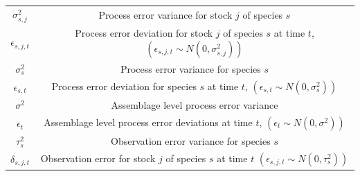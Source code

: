 \documentclass[]{scrartcl}
\begin{document}
\begin{table}[htbp]
\begin{center}
\begin{tabular}{c|c}
$\sigma_{s,j}^2$ & Process error variance for stock $j$ of species $s$ \\
$\epsilon_{s,j,t}$ & Process error deviation for stock $j$ of species $s$ at time $t$, $\left( \epsilon_{s,j,t} \sim N (0, \sigma_{s,j}^2) \right)$ \\
$\sigma_{s}^2$ & Process error variance for species $s$ \\
$\epsilon_{s,t}$ & Process error deviation for species $s$ at time $t$, $\left( \epsilon_{s,t} \sim N (0, \sigma_s^2) \right)$ \\
$\sigma^2$ & Assemblage level process error variance  \\
$\epsilon_{t}$ & Assemblage level process error deviations at time $t$, $\left( \epsilon_{t} \sim N (0, \sigma^2) \right)$ \\
$\tau_s^2$ & Observation error variance for species $s$ \\
$\delta_{s,j,t}$ & Observation error for stock $j$ of species $s$ at time $t$ $\left(\epsilon_{s,j,t} \sim N (0, \tau_s^2) \right)$ \\
\hline
\end{tabular}
\end{center}
\end{table}

\newpage
\end{document}
